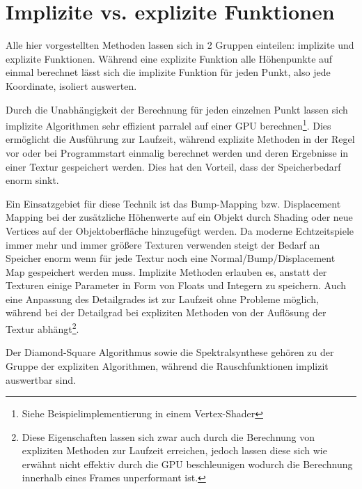 \section{Implizite vs. explizite Funktionen}
Alle hier vorgestellten Methoden lassen sich in 2 Gruppen einteilen: implizite und explizite Funktionen.
Während eine explizite Funktion alle Höhenpunkte auf einmal berechnet lässt sich die implizite Funktion für jeden Punkt, also jede Koordinate, isoliert auswerten. 

Durch die Unabhängigkeit der Berechnung für jeden einzelnen Punkt lassen sich implizite Algorithmen sehr effizient parralel auf einer GPU berechnen\footnote{Siehe Beispielimplementierung in einem Vertex-Shader}. Dies ermöglicht die Ausführung zur Laufzeit, während explizite Methoden in der Regel vor oder bei Programmstart einmalig berechnet werden und deren Ergebnisse in einer Textur gespeichert werden.
Dies hat den Vorteil, dass der Speicherbedarf enorm sinkt.

Ein Einsatzgebiet für diese Technik ist das Bump-Mapping bzw. Displacement Mapping bei der zusätzliche Höhenwerte auf ein Objekt durch Shading oder neue Vertices auf der Objektoberfläche hinzugefügt werden\cite{displacementNStuff}. Da moderne Echtzeitspiele immer mehr und immer größere Texturen verwenden steigt der Bedarf an Speicher enorm wenn für jede Textur noch eine Normal/Bump/Displacement Map gespeichert werden muss. Implizite Methoden erlauben es, anstatt der Texturen einige Parameter in Form von Floats und Integern zu speichern.
Auch eine Anpassung des Detailgrades ist zur Laufzeit ohne Probleme möglich, während bei der Detailgrad bei expliziten Methoden von der Auflösung der Textur abhängt\footnote{Diese Eigenschaften lassen sich zwar auch durch die Berechnung von expliziten Methoden zur Laufzeit erreichen, jedoch lassen diese sich wie erwähnt nicht effektiv durch die GPU beschleunigen wodurch die Berechnung innerhalb eines Frames unperformant ist.}.

Der Diamond-Square Algorithmus sowie die Spektralsynthese gehören zu der Gruppe der expliziten Algorithmen, während die Rauschfunktionen implizit auswertbar sind.
